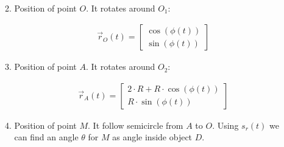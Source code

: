 \begin{enumerate}
\begin{enumerate}
\begin{answer}
\begin{align}
                        \end{align}
                    \end{answer}
              \item Position of point $O$. It rotates around $O_1$:
                    \begin{answer}
                        \begin{align}
                            \vec{r}_{O}(t) = \begin{bmatrix}
                                \cos(\phi(t)) \\
                                \sin(\phi(t))
                            \end{bmatrix}
                        \end{align}
                    \end{answer}
              \item Position of point $A$. It rotates around $O_2$:
                    \begin{answer}
                        \begin{align}
                            \vec{r}_{A}(t) = \begin{bmatrix}
                                2 \cdot R + R \cdot \cos(\phi(t)) \\
                                R \cdot \sin(\phi(t))
                            \end{bmatrix}
                        \end{align}
                    \end{answer}
              \item Position of point $M$. It follow semicircle from $A$ to $O$.
                    Using $s_r(t)$ we can find an angle $\theta$ for $M$ as angle inside object $D$.\\
                    \begin{center}
                    \end{center}


\end{enumerate}
\end{enumerate}
